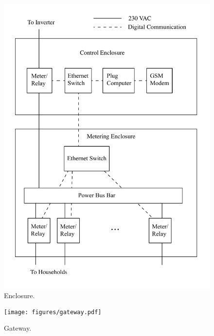 \documentclass[conference]{IEEEtran}
\begin{document}
\begin{figure}[]
\begin{center}
\includegraphics[width=\columnwidth]{figures/Enclosure.pdf}
\end{center}
\caption{Enclosure.}
\label{Enclosure}
\end{figure}


\begin{figure}[]
\begin{center}
\texttt{[image: figures/gateway.pdf]}
\end{center}
\caption{Gateway.}
\label{gateway}
\end{figure}
\end{document}
